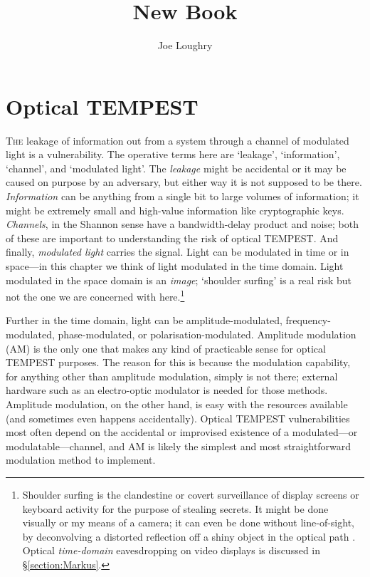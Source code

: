 \documentclass[a4paper,twoside,11pt,openany]{book}
\begin{document}
\title{New Book}
\author{Joe Loughry}
\setcounter{chapter}{6} %
\setcounter{page}{263} %
\thispagestyle{empty}
\chapter{Optical TEMPEST}
\lettrine[lines=3]{T}{he} leakage of information out from a system through a
channel of modulated light is a vulnerability. The operative terms here are
`leakage',
`information', `channel', and `modulated light'. The \emph{leakage} might be
accidental or it may be caused on purpose by an adversary, but either way it
is not
supposed to be there. \emph{Information} can be anything from a single bit to
large volumes of information; it might be extremely small and high-value
information like
cryptographic keys. \emph{Channels}, in the Shannon sense \cite{Shannon1948}
have a bandwidth-delay product and noise; both of these are important to
understanding the risk of optical TEMPEST. And finally, \emph{modulated light}
carries the signal. Light can be modulated in time or in space---in this
chapter we think of
light modulated in the time domain. Light modulated in the space domain is an
\emph{image}; `shoulder surfing' is a real risk but not the one we are
concerned with here.\footnote{Shoulder surfing is the clandestine or covert
surveillance of display screens or keyboard activity for the purpose of
stealing secrets. It might be done visually or my means of a camera; it can
even be done without line-of-sight, by deconvolving a distorted reflection off
a shiny object in the optical path
\cite{Backes2008,Backes2009a,Raguram2011,Jenkins2013a,Xu2013a}. Optical
\emph{time-domain} eavesdropping on video displays \cite{Kuhn2002} is discussed
in \S \ref{section:Markus}.}

Further in the time domain, light can be amplitude-modulated,
frequency-modulated, phase-modulated, or polarisation-modulated. Amplitude
modulation (AM) is the only one that makes any kind of practicable sense for
optical TEMPEST purposes. The reason for this is because the modulation
capability, for anything other than amplitude modulation, simply is not there;
external hardware such as an electro-optic modulator is needed for those
methods. Amplitude modulation, on the other hand, is easy with the resources
available (and sometimes even happens accidentally). Optical TEMPEST
vulnerabilities most often depend on the accidental or improvised existence of
a modulated---or modulatable---channel, and AM is likely the simplest and most
straightforward modulation method to implement.
\end{document}
